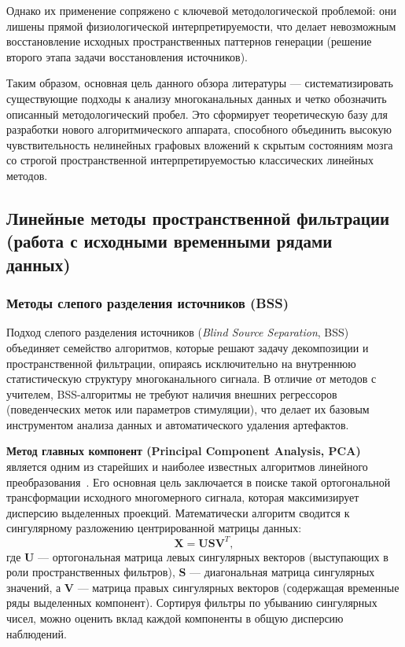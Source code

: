 Однако их применение сопряжено с ключевой методологической проблемой: они лишены прямой физиологической интерпретируемости, что делает невозможным восстановление исходных пространственных паттернов генерации (решение второго этапа задачи восстановления источников).

Таким образом, основная цель данного обзора литературы --- систематизировать существующие подходы к анализу многоканальных данных и четко обозначить описанный методологический пробел. Это сформирует теоретическую базу для разработки нового алгоритмического аппарата, способного объединить высокую чувствительность нелинейных графовых вложений к скрытым состояниям мозга со строгой пространственной интерпретируемостью классических линейных методов.

\subsection{Линейные методы пространственной фильтрации (работа с исходными временными рядами данных)}
\label{sec:linear_methods_timeseries}

\subsubsection{Методы слепого разделения источников (BSS)}
\label{sec:bss_methods}

Подход слепого разделения источников (\textit{Blind Source Separation}, BSS) объединяет семейство алгоритмов, которые решают задачу декомпозиции и пространственной фильтрации, опираясь исключительно на внутреннюю статистическую структуру многоканального сигнала. В отличие от методов с учителем, BSS-алгоритмы не требуют наличия внешних регрессоров (поведенческих меток или параметров стимуляции), что делает их базовым инструментом анализа данных и автоматического удаления артефактов.

\textbf{Метод главных компонент (Principal Component Analysis, PCA)} является одним из старейших и наиболее известных алгоритмов линейного преобразования~\cite{pearson1901liii, hotelling1933analysis}. Его основная цель заключается в поиске такой ортогональной трансформации исходного многомерного сигнала, которая максимизирует дисперсию выделенных проекций. Математически алгоритм сводится к сингулярному разложению центрированной матрицы данных:
\begin{equation}
	\mathbf{X} = \mathbf{U}\mathbf{S}\mathbf{V}^T,
\end{equation}
где $\mathbf{U}$ --- ортогональная матрица левых сингулярных векторов (выступающих в роли пространственных фильтров), $\mathbf{S}$ --- диагональная матрица сингулярных значений, а $\mathbf{V}$ --- матрица правых сингулярных векторов (содержащая временные ряды выделенных компонент). Сортируя фильтры по убыванию сингулярных чисел, можно оценить вклад каждой компоненты в общую дисперсию наблюдений. 

